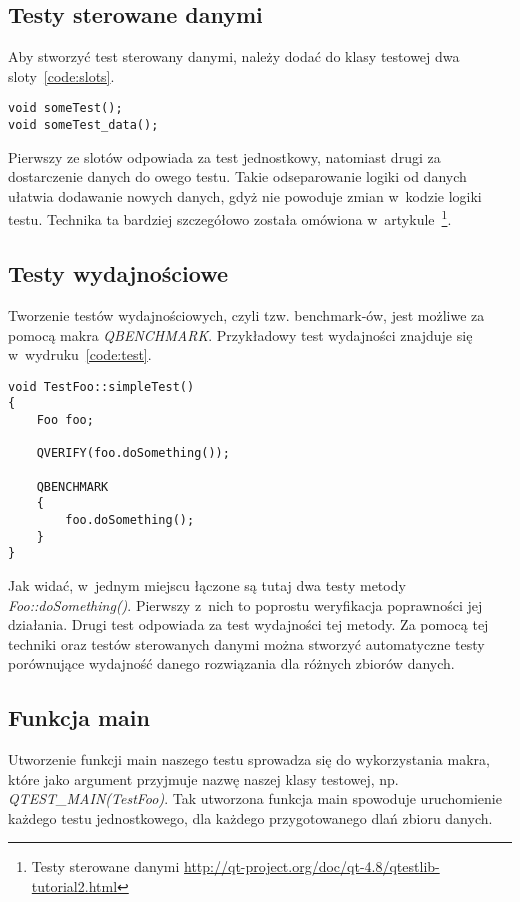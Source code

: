 \subsection{Testy sterowane danymi}
Aby stworzyć test sterowany danymi, należy dodać do klasy testowej dwa sloty~\ref{code:slots}.
\begin{lstlisting}[caption=Slot z danymi, label=code:slots]
void someTest();
void someTest_data();
\end{lstlisting}
Pierwszy ze slotów odpowiada za test jednostkowy, natomiast drugi za dostarczenie danych do owego testu. Takie odseparowanie logiki od danych ułatwia dodawanie nowych danych, gdyż nie powoduje zmian w~kodzie logiki testu. Technika ta bardziej szczegółowo została omówiona w~artykule~\footnote{Testy sterowane danymi \url{http://qt-project.org/doc/qt-4.8/qtestlib-tutorial2.html}}.

\subsection{Testy wydajnościowe}
Tworzenie testów wydajnościowych, czyli tzw. benchmark-ów, jest możliwe za pomocą makra \textit{QBENCHMARK}. Przykładowy test wydajności znajduje się w~wydruku~\ref{code:test}.
\begin{lstlisting}[caption=Test wydajności, label=code:test]
void TestFoo::simpleTest()
{
	Foo foo;

	QVERIFY(foo.doSomething());

	QBENCHMARK 
	{
		foo.doSomething();
	}
}
\end{lstlisting}

Jak widać, w~jednym miejscu łączone są tutaj dwa testy metody \newline \textit{Foo::doSomething()}. Pierwszy z~nich to poprostu weryfikacja poprawności jej działania. Drugi test odpowiada za test wydajności tej metody. Za pomocą tej techniki oraz testów sterowanych danymi można stworzyć automatyczne testy porównujące wydajność danego rozwiązania dla różnych zbiorów danych.

\subsection{Funkcja main}
Utworzenie funkcji main naszego testu sprowadza się do wykorzystania makra, które jako argument przyjmuje nazwę naszej klasy testowej, np.
\textit{QTEST\_MAIN(TestFoo)}. Tak utworzona funkcja main spowoduje uruchomienie każdego testu jednostkowego, dla każdego przygotowanego dlań zbioru danych.

